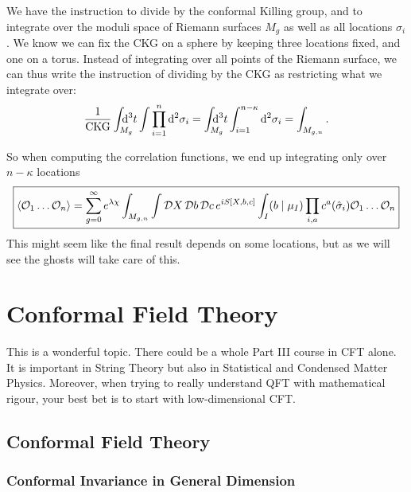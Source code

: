 \begin{remark}
  We have the instruction to divide by the conformal Killing group, and to integrate over the moduli space of Riemann surfaces $M_g$ as well as all locations $\sigma_i$. 
  We know we can fix the CKG on a sphere by keeping three locations fixed, and one on a torus.
  Instead of integrating over all points of the Riemann surface, we can thus write the instruction of dividing by the CKG as restricting what we integrate over:
  \begin{equation}
    \frac{1}{\text{CKG}} \int_{\mathrlap{M_g}} \dd[3]{t} \int \prod_{i=1}^n \dd[2]{\sigma_i} = \int_{\mathrlap{M_g}} \dd[3]{t} \int_{i=1}^{n-\kappa} \dd[2]{\sigma_i} = \int_{M_{g, n}}.
  \end{equation}
\end{remark}

So when computing the correlation functions, we end up integrating only over $n - \kappa$ locations
\begin{equation}
  \boxed{\langle \mathcal{O}_1 \dots \mathcal{O}_n \rangle = \sum_{g=0}^{\infty} e^{\lambda \chi} \int_{M_{g, n}} \int \pdd{X} \pdd{b} \pdd{c} e^{i S[X, b, c]} \int_I (b \suchthat \mu_I) \prod_{i, a} c^a (\hat{\sigma}_i) \mathcal{O}_1 \dots \mathcal{O}_n}
\end{equation}
This might seem like the final result depends on some locations, but as we will see the ghosts will take care of this.

\chapter{Conformal Field Theory}%
\label{cha:conformal_field_theory}

This is a wonderful topic. There could be a whole Part III course in CFT alone. It is important in String Theory but also in Statistical and Condensed Matter Physics.
Moreover, when trying to really understand QFT with mathematical rigour, your best bet is to start with low-dimensional CFT.

\section{Conformal Field Theory}%
\label{sec:conformal_field_theory}

\subsection{Conformal Invariance in General Dimension}%
\label{sub:conformal_invariance_in_general_dimension}


